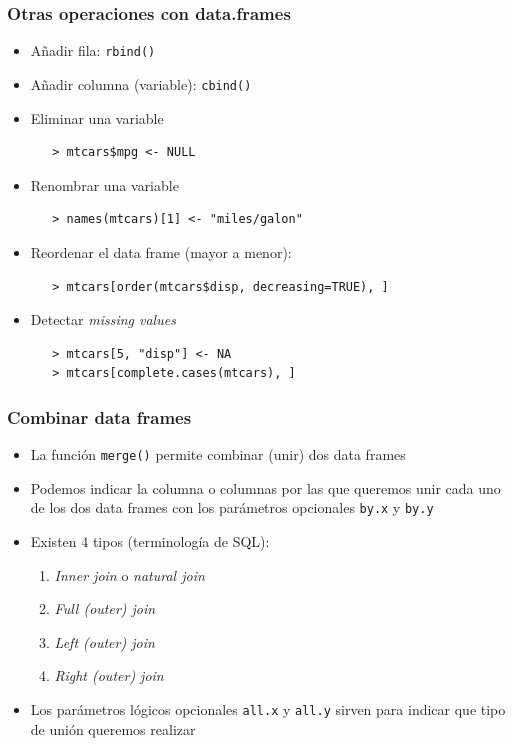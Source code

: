 \documentclass{beamer}
\begin{document}
\begin{frame}[fragile]
\frametitle{Otras operaciones con data.frames}
\begin{itemize}
\item Añadir fila: \texttt{rbind()}
\item Añadir columna (variable): \texttt{cbind()}
\item Eliminar una variable
\begin{verbatim}
   > mtcars$mpg <- NULL
\end{verbatim}
\item Renombrar una variable
\begin{verbatim}
   > names(mtcars)[1] <- "miles/galon"
\end{verbatim}
\item Reordenar el data frame (mayor a menor):
\begin{verbatim}
   > mtcars[order(mtcars$disp, decreasing=TRUE), ]
\end{verbatim}
\item Detectar \textit{missing values}
\begin{verbatim}
   > mtcars[5, "disp"] <- NA
   > mtcars[complete.cases(mtcars), ]
\end{verbatim}
\end{itemize}
\end{frame}

\begin{frame}
  \frametitle{Combinar data frames}
  \begin{itemize}
    \item La función \texttt{merge()} permite combinar (unir) dos data frames
    \item Podemos indicar la columna o columnas por las que queremos unir cada uno de los dos data frames con los parámetros opcionales \texttt{by.x} y \texttt{by.y}
    \item Existen 4 tipos (terminología de SQL):
      \begin{enumerate}
        \item \textit{Inner join} o \textit{natural join}
        \item \textit{Full (outer) join}
        \item \textit{Left (outer) join}
        \item \textit{Right (outer) join}
      \end{enumerate}
    \item Los parámetros lógicos opcionales \texttt{all.x} y \texttt{all.y} sirven para indicar que tipo de unión queremos realizar
  \end{itemize}
\end{frame}
\end{document}
